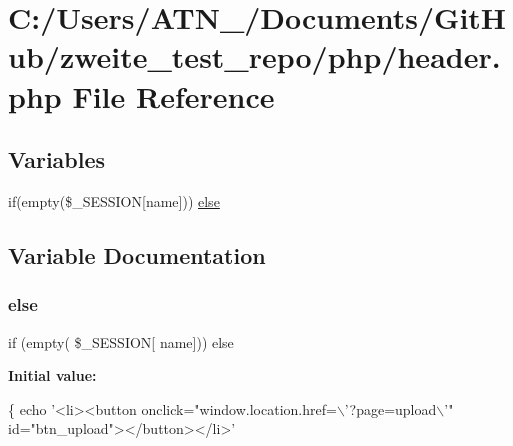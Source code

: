 \hypertarget{header_8php}{}\section{C\+:/\+Users/\+A\+T\+N\+\_/\+Documents/\+Git\+Hub/zweite\+\_\+test\+\_\+repo/php/header.php File Reference}
\label{header_8php}
\subsection*{Variables}
\begin{DoxyCompactItemize}
\item 
if(empty(\$\+\_\+\+S\+E\+S\+S\+I\+ON\mbox{[}\textquotesingle{}name\textquotesingle{}\mbox{]})) \mbox{\hyperlink{header_8php_a4bbee1408ac1c4aba277b9e8c4fda8dd}{else}}
\end{DoxyCompactItemize}


\subsection{Variable Documentation}
\mbox{\label{header_8php_a4bbee1408ac1c4aba277b9e8c4fda8dd}} 
\subsubsection{\texorpdfstring{else}{else}}
{\footnotesize\ttfamily if (empty( \$\+\_\+\+S\+E\+S\+S\+I\+ON\mbox{[} \textquotesingle{}name\textquotesingle{}\mbox{]})) else}

{\bfseries Initial value\+:}
\begin{DoxyCode}
\{
                 echo   \textcolor{stringliteral}{'<li><button onclick="window.location.href=\(\backslash\)'?page=upload\(\backslash\)'"
       id="btn\_upload"></button></li>'}
\end{DoxyCode}

